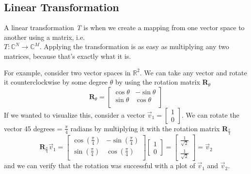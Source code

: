 \documentclass{article}
\begin{document}
\subsection*{Linear Transformation}
A linear transformation \textit{T} is when we create a mapping from one vector space to another using a matrix, i.e.\\
$\textit{T}: \mathbb{C}^N \rightarrow \mathbb{C}^M$.
Applying the transformation is as easy as multiplying any two matrices, because that's exactly what it is.

For example, consider two vector spaces in $\mathbb{R}^2$.
We can take any vector and rotate it counterclockwise by some degree $\theta$ by using the rotation matrix \textbf{R}$_{\theta}$
\begin{equation}
  \textbf{R}_{\theta} =
  \begin{bmatrix}
    \cos{\theta} & -\sin{\theta}\\
    \sin{\theta} & \cos{\theta} \\
  \end{bmatrix}
\end{equation}
If we wanted to visualize this, consider a vector $\vec{v}_1 = \begin{bmatrix} 1 \\ 0 \end{bmatrix}$.
We can rotate the vector 45 degrees = $\frac{\pi}{4}$ radians by multiplying it with the rotation matrix \textbf{R}$_\frac{\pi}{4}$
\begin{equation}
  \textbf{R}_\frac{\pi}{4} \vec{v}_1 =
  \begin{bmatrix}
    \cos{( \frac{\pi}{4} )} & -\sin{( \frac{\pi}{4} )}\\[6pt]
    \sin{( \frac{\pi}{4} )} & \cos{( \frac{\pi}{4} )} \\
  \end{bmatrix}
  \begin{bmatrix}
    1 \\ 0
  \end{bmatrix}
  =
  \begin{bmatrix}
    \frac{1}{\sqrt{2}} \\[6pt] \frac{1}{\sqrt{2}}
  \end{bmatrix}
  = \vec{v}_2
\end{equation}
and we can verify that the rotation was successful with a plot of $\vec{v}_1$ and $\vec{v}_2$.
\end{document}
